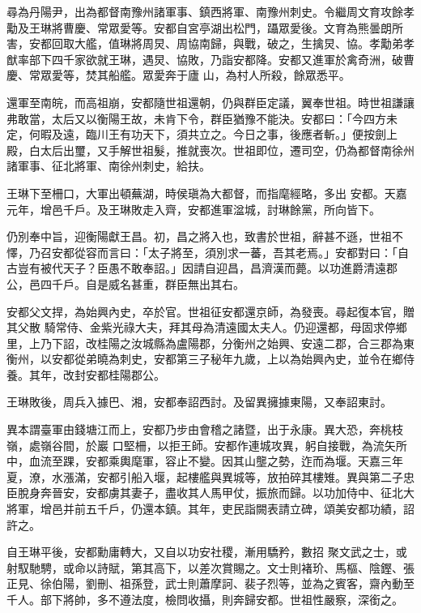 \begin{pinyinscope}
 尋為丹陽尹，出為都督南豫州諸軍事、鎮西將軍、南豫州刺史。令繼周文育攻餘孝勱及王琳將曹慶、常眾愛等。安都自宮亭湖出松門，躡眾愛後。文育為熊曇朗所害，安都回取大艦，值琳將周炅、周協南歸，與戰，破之，生擒炅、協。孝勱弟孝猷率部下四千家欲就王琳，遇炅、協敗，乃詣安都降。安都又進軍於禽奇洲，破曹慶、常眾愛等，焚其船艦。眾愛奔于廬
 山，為村人所殺，餘眾悉平。



 還軍至南皖，而高祖崩，安都隨世祖還朝，仍與群臣定議，翼奉世祖。時世祖謙讓弗敢當，太后又以衡陽王故，未肯下令，群臣猶豫不能決。安都曰：「今四方未定，何暇及遠，臨川王有功天下，須共立之。今日之事，後應者斬。」便按劍上殿，白太后出璽，又手解世祖髮，推就喪次。世祖即位，遷司空，仍為都督南徐州諸軍事、征北將軍、南徐州刺史，給扶。



 王琳下至柵口，大軍出頓蕪湖，時侯瑱為大都督，而指麾經略，多出
 安都。天嘉元年，增邑千戶。及王琳敗走入齊，安都進軍湓城，討琳餘黨，所向皆下。



 仍別奉中旨，迎衡陽獻王昌。初，昌之將入也，致書於世祖，辭甚不遜，世祖不懌，乃召安都從容而言曰：「太子將至，須別求一蕃，吾其老焉。」安都對曰：「自古豈有被代天子？臣愚不敢奉詔。」因請自迎昌，昌濟漢而薨。以功進爵清遠郡公，邑四千戶。自是威名甚重，群臣無出其右。



 安都父文捍，為始興內史，卒於官。世祖征安都還京師，為發喪。尋起復本官，贈其父散
 騎常侍、金紫光祿大夫，拜其母為清遠國太夫人。仍迎還都，母固求停鄉里，上乃下詔，改桂陽之汝城縣為盧陽郡，分衡州之始興、安遠二郡，合三郡為東衡州，以安都從弟曉為刺史，安都第三子秘年九歲，上以為始興內史，並令在鄉侍養。其年，改封安都桂陽郡公。



 王琳敗後，周兵入據巴、湘，安都奉詔西討。及留異擁據東陽，又奉詔東討。



 異本謂臺軍由錢塘江而上，安都乃步由會稽之諸暨，出于永康。異大恐，奔桃枝嶺，處嶺谷間，於巖
 口堅柵，以拒王師。安都作連城攻異，躬自接戰，為流矢所中，血流至踝，安都乘輿麾軍，容止不變。因其山壟之勢，迮而為堰。天嘉三年夏，潦，水漲滿，安都引船入堰，起樓艦與異城等，放拍碎其樓雉。異與第二子忠臣脫身奔晉安，安都虜其妻子，盡收其人馬甲仗，振旅而歸。以功加侍中、征北大將軍，增邑并前五千戶，仍還本鎮。其年，吏民詣闕表請立碑，頌美安都功績，詔許之。



 自王琳平後，安都勳庸轉大，又自以功安社稷，漸用驕矜，數招
 聚文武之士，或射馭馳騁，或命以詩賦，第其高下，以差次賞賜之。文士則褚玠、馬樞、陰鏗、張正見、徐伯陽，劉刪、祖孫登，武士則蕭摩訶、裴子烈等，並為之賓客，齋內動至千人。部下將帥，多不遵法度，檢問收攝，則奔歸安都。世祖性嚴察，深銜之。




\end{pinyinscope}
